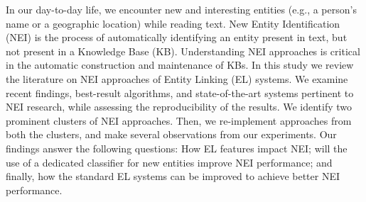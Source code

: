 In our day-to-day life, we encounter new and interesting entities (e.g., a person's name or a geographic location) while reading text. New Entity Identification (NEI) is the process of automatically identifying an entity present in text, but not present in a Knowledge Base (KB). Understanding NEI approaches is critical in the automatic construction and maintenance of KBs. In this study we review the literature on NEI approaches of Entity Linking (EL) systems. We examine recent findings, best-result algorithms, and state-of-the-art systems pertinent to NEI research, while assessing the reproducibility of the results. We identify two prominent clusters of NEI approaches. Then, we re-implement approaches from both the clusters, and make several observations from our experiments. Our findings answer the following questions: How EL features impact NEI; will the use of a dedicated classifier for new entities improve NEI performance; and finally, how the standard EL systems can be improved to achieve better NEI performance.
